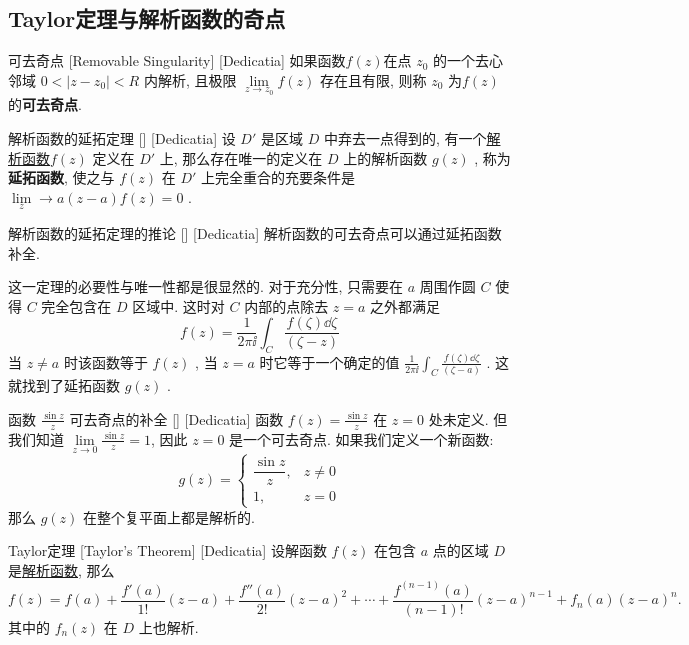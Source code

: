 \documentclass[UTF8]{ctexart}
\newcommand{\AnalyticalFunction}{\hyperref[dfn:AnalyticalFunction]{解析函数}}
\begin{document}
\subsection{Taylor定理与解析函数的奇点}
\begin{dfn}
    [RemovableSingularity]
    {可去奇点}
    [Removable Singularity]
    [Dedicatia]
    如果函数\( f(z) \)在点 \( z_0 \) 的一个去心邻域 \( 0 < |z - z_0| < R \) 内解析, 且极限 \( \lim\limits_{z \to z_0} f(z) \) 存在且有限, 则称 \( z_0 \) 为\( f(z) \)的\textbf{可去奇点}. 
\end{dfn}
\begin{thm}
    [UUID]
    {解析函数的延拓定理}
    []
    [Dedicatia]
    设 \( D' \) 是区域 \( D \) 中弃去一点得到的, 有一个\AnalyticalFunction  \( f(z) \) 定义在 \( D' \) 上, 那么存在唯一的定义在 \( D \) 上的解析函数 \( g(z) \) , 称为\textbf{延拓函数}, 使之与 \( f(z) \) 在 \( D' \) 上完全重合的充要条件是 \( \lim\limits_z\to a(z-a)f(z)=0 \) .
\end{thm}
\begin{crl}
    [UUID]
    {解析函数的延拓定理的推论}
    []
    [Dedicatia]
    解析函数的可去奇点可以通过延拓函数补全. 
\end{crl}
\begin{prf}
    这一定理的必要性与唯一性都是很显然的. 对于充分性, 只需要在 \( a \) 周围作圆 \( C \) 使得 \( C \) 完全包含在 \( D \) 区域中. 这时对 \( C \) 内部的点除去 \( z=a \) 之外都满足
    \[f(z)=\frac{1}{2\pi\ii}\int_C \frac{f(\zeta)\dd{\zeta}}{(\zeta-z)}\]
    当 \( z\neq a \) 时该函数等于 \( f(z) \) , 当 \( z=a \) 时它等于一个确定的值 \( \frac{1}{2\pi\ii}\int_C \frac{f(\zeta)\dd{\zeta}}{(\zeta-a)} \) . 这就找到了延拓函数 \( g(z) \) .
\end{prf}
\begin{xmp}
    [UUID]
    {函数 \( \frac{\sin z}{z} \) 可去奇点的补全}
    []
    [Dedicatia]
    函数 \( f(z) = \frac{\sin z}{z} \) 在 \( z = 0 \) 处未定义. 但我们知道 \( \lim\limits_{z \to 0} \frac{\sin z}{z} = 1 \), 因此 \( z=0 \) 是一个可去奇点. 如果我们定义一个新函数: 
    \[
    g(z) = \begin{cases}
    \dfrac{\sin z}{z}, & z \neq 0 \\
    1, & z = 0
    \end{cases}
    \]
    那么 \( g(z) \) 在整个复平面上都是解析的. 
\end{xmp}
\begin{thm}
    [Taylor]
    {Taylor定理\label{thm:Taylor}}
    [Taylor's Theorem]
    [Dedicatia]
    设解函数 \( f(z) \) 在包含 \( a \) 点的区域 \( D \) 是\AnalyticalFunction , 那么
    \[f(z)=f(a)+\frac{f'(a)}{1!}(z-a)+\frac{f''(a)}{2!}(z-a)^2+\cdots+\frac{f^{(n-1)}(a)}{(n-1)!}(z-a)^{n-1}+f_n(a)(z-a)^n.\]
    其中的 \( f_n(z) \) 在 \( D \) 上也解析. 
\end{thm}
\end{document}
